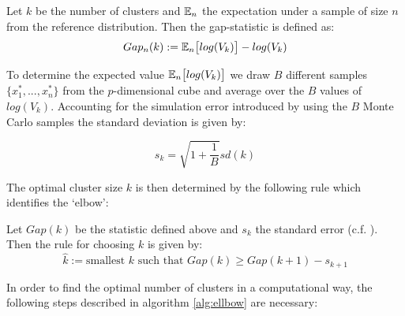 \begin{definition}
Let $k$ be the number of clusters and $\mathbb{E}_n$ the expectation under a sample of size $n$ from
the reference distribution. Then the gap-statistic is defined as: 
	\begin{equation}\label{equ:gap_statistic}
		Gap_n(k) := \mathbb{E}_n\big[log(V_k) \big] - log(V_k)
	\end{equation}
\end{definition}

To determine the expected value $\mathbb{E}_n\big[log(V_k) \big]$ we draw $B$ different samples $\{x_1^*, ..., x_n^*\}$ from the $p$-dimensional cube and average over the $B$ values of $log(V_k)$. Accounting for the simulation error introduced by using the $B$ Monte Carlo samples the standard deviation is given by: 

\begin{equation*}
	s_k = \sqrt{1 + \frac{1}{B}} sd(k)
\end{equation*}

The optimal cluster size $k$ is then determined by the following rule which identifies the `elbow':

\begin{definition} Let $Gap(k)$ be the statistic defined above and $s_k$ the standard error (c.f. \cite{tibshirani2001estimating}). Then the rule for choosing $k$ is given by: 
	\begin{equation}\label{equ:gap_statistic_rule}
	\hat{k} := \text{smallest } k \text{ such that } Gap(k) \geq Gap(k+1) - s_{k+1}
	\end{equation}
\end{definition}

In order to find the optimal number of clusters in a computational way, the following steps described in algorithm \ref{alg:ellbow} are necessary:

